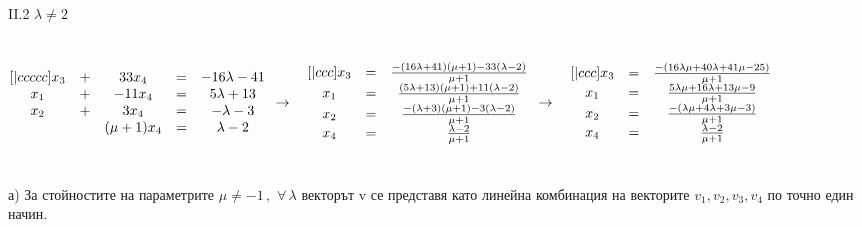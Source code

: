 \documentclass{article}
\begin{document}
    \\
    II.2 \(\lambda \neq 2\)\\
    \\
    \\
    \begin{math}
       \begin{matrix}[|ccccc]
            x_3 & + & 33x_4 & = & -16\lambda - 41\\
            x_1 & + & -11x_4 & = & 5\lambda + 13\\
            x_2 & + & 3x_4 & = & -\lambda - 3\\
            ~ & ~ & (\mu + 1)x_4 & = & \lambda - 2\\
        \end{matrix}\\
        \\
        \\
        \to\quad
        \begin{matrix}[|ccc]
            x_3 & = & \frac{-(16\lambda + 41)(\mu + 1) - 33(\lambda - 2)}{\mu + 1}\\
            x_1 & = & \frac{(5\lambda + 13)(\mu + 1) + 11(\lambda - 2)}{\mu + 1}\\
            x_2 & = & \frac{-(\lambda + 3)(\mu + 1) - 3(\lambda - 2)}{\mu + 1}\\
            x_4 & = & \frac{\lambda - 2}{\mu + 1}
        \end{matrix}\\
        \\
        \\
        \to\quad
        \begin{matrix}[|ccc]
            x_3 & = & \frac{-(16\lambda\mu + 40\lambda + 41\mu - 25)}{\mu + 1}\\
            x_1 & = & \frac{5\lambda\mu + 16\lambda + 13\mu - 9}{\mu + 1}\\
            x_2 & = & \frac{-(\lambda\mu + 4\lambda + 3\mu -3)}{\mu + 1}\\
            x_4 & = & \frac{\lambda - 2}{\mu + 1}
        \end{matrix}
    \end{math}\\
    \\
    \\
    а) За стойностите на параметрите \(\mu \neq -1\,,\,\, \forall\,\lambda\) векторът v се представя като линейна комбинация на векторите \(v_1, v_2, v_3, v_4\) по точно един начин.\\
    \\
\end{document}
